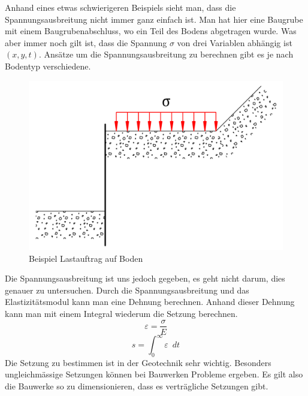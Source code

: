 Anhand eines etwas schwierigeren Beispiels sieht man,
dass die Spannungsausbreitung nicht immer ganz einfach ist.
Man hat hier eine Baugrube mit einem Baugrubenabschluss, wo ein Teil des Bodens abgetragen wurde.
Was aber immer noch gilt ist, dass die Spannung $\sigma$ von drei Variablen abhängig ist $(x,y,t)$.
Ansätze um die Spannungsausbreitung zu berechnen gibt es je nach Bodentyp verschiedene.

\begin{figure}
	\centering
	\includegraphics[width=0.5\linewidth,keepaspectratio]{papers/spannung/Grafiken/Bild3.png}
	\caption{Beispiel Lastauftrag auf Boden}
	\label{fig:Bild3}
\end{figure}

Die Spannungsausbreitung ist uns jedoch gegeben, es geht nicht darum, dies genauer zu untersuchen.
Durch die Spannungsausbreitung und das Elastizitätsmodul kann man eine Dehnung berechnen.
Anhand dieser Dehnung kann man mit einem Integral wiederum die Setzung berechnen.
\[
\varepsilon
=
\frac{\sigma}{E}
\]
\[
s
=
\int_{0}^{\infty}\varepsilon\enspace dt
\]
Die Setzung zu bestimmen ist in der Geotechnik sehr wichtig.
Besonders ungleichmässige Setzungen können bei Bauwerken Probleme ergeben.
Es gilt also die Bauwerke so zu dimensionieren, dass es verträgliche Setzungen gibt.